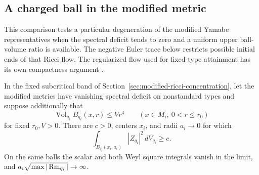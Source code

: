 \subsection{A charged ball in the modified metric}
\label{sec:modified-ball-charge}

This comparison tests a particular degeneration of the modified Yamabe
representatives when the spectral deficit tends to zero and a uniform
upper ball-volume ratio is available. The negative Euler trace below
restricts possible initial ends of that Ricci flow. The regularized
flow used for fixed-type attainment has its own compactness argument
\cite{Baker2026BourAttainment}.

\begin{proposition}\label{prop:modified-ball-charge}
In the fixed subcritical band of Section~\ref{sec:modified-ricci-concentration}, let the modified metrics have vanishing spectral deficit on nonstandard types and
suppose additionally that
\[
 \operatorname{Vol}_{q_i} B_{q_i}(x,r)\le V r^4
 \qquad(x\in M_i,\ 0<r\le r_0)
\]
for fixed \(r_0,V>0\). There are \(c>0\), centers \(x_i\), and
radii \(a_i\to0\)
for which
\[
 \int_{B_{q_i}(x_i,a_i)} |Z_{q_i}|^2\,dV_{q_i}\ge c.
\]
On the same balls the scalar and both Weyl square integrals vanish
in the limit, and \(a_i\sqrt{\max|\operatorname{Rm}_{q_i}|}\to\infty\).
\end{proposition}

